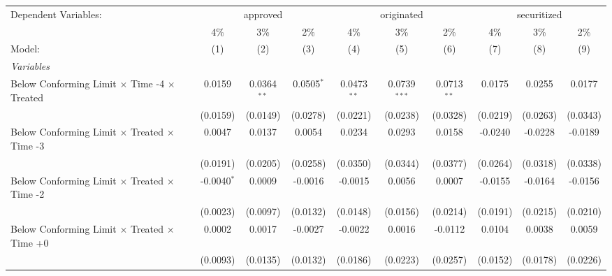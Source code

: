 \begingroup
\centering
\begin{tabular}{lccccccccc}
   \tabularnewline \midrule \midrule
   Dependent Variables: & \multicolumn{3}{c}{approved} & \multicolumn{3}{c}{originated} & \multicolumn{3}{c}{securitized}\\
                                                              & 4\%            & 3\%            & 2\%           & 4\%           & 3\%            & 2\%           & 4\%           & 3\%           & 2\% \\    
   Model:                                                     & (1)            & (2)            & (3)           & (4)           & (5)            & (6)           & (7)           & (8)           & (9)\\  
   \midrule
   \emph{Variables}\\
   Below Conforming Limit $\times$ Time -4 $\times$ Treated   & 0.0159         & 0.0364$^{**}$  & 0.0505$^{*}$  & 0.0473$^{**}$ & 0.0739$^{***}$ & 0.0713$^{**}$ & 0.0175        & 0.0255        & 0.0177\\   
                                                              & (0.0159)       & (0.0149)       & (0.0278)      & (0.0221)      & (0.0238)       & (0.0328)      & (0.0219)      & (0.0263)      & (0.0343)\\   
   Below Conforming Limit $\times$ Treated $\times$ Time -3   & 0.0047         & 0.0137         & 0.0054        & 0.0234        & 0.0293         & 0.0158        & -0.0240       & -0.0228       & -0.0189\\   
                                                              & (0.0191)       & (0.0205)       & (0.0258)      & (0.0350)      & (0.0344)       & (0.0377)      & (0.0264)      & (0.0318)      & (0.0338)\\   
   Below Conforming Limit $\times$ Treated $\times$ Time -2   & -0.0040$^{*}$  & 0.0009         & -0.0016       & -0.0015       & 0.0056         & 0.0007        & -0.0155       & -0.0164       & -0.0156\\   
                                                              & (0.0023)       & (0.0097)       & (0.0132)      & (0.0148)      & (0.0156)       & (0.0214)      & (0.0191)      & (0.0215)      & (0.0210)\\   
   Below Conforming Limit $\times$ Treated $\times$ Time +0   & 0.0002         & 0.0017         & -0.0027       & -0.0022       & 0.0016         & -0.0112       & 0.0104        & 0.0038        & 0.0059\\   
                                                              & (0.0093)       & (0.0135)       & (0.0132)      & (0.0186)      & (0.0223)       & (0.0257)      & (0.0152)      & (0.0178)      & (0.0226)\\   

\end{tabular}
